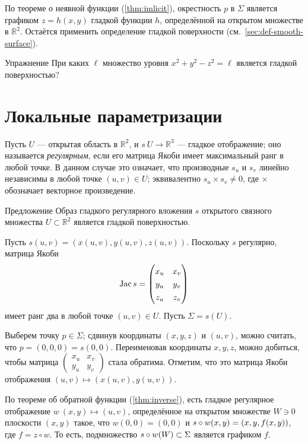 По теореме о неявной функции (\ref{thm:imlicit}), окрестность $p$ в $\Sigma$ является графиком $z=h(x,y)$ гладкой функции $h$, определённой на открытом множестве в $\mathbb{R}^2$.
Остаётся применить определение гладкой поверхности (см.~\ref{sec:def-smooth-surface}).
\qeds

\begin{thm}{Упражнение}\label{ex:hyperboloids}
При каких $\ell$ множество уровня $x^2+y^2-z^2=\ell$ является гладкой поверхностью?
\end{thm}

\section{Локальные параметризации}

Пусть $U$ --- открытая область в $\mathbb{R}^2$, и $s\:U\to \mathbb{R}^3$ --- гладкое отображение;
оно называется \emph{регулярным}, если его матрица Якоби имеет максимальный ранг в любой точке.
В данном случае это означает, что производные $s_u$ и $s_v$ линейно независимы в любой точке $(u,v)\in U$;
эквивалентно $s_u\times s_v\ne 0$, где $\times$ обозначает векторное произведение.

\begin{thm}{Предложение}\label{prop:graph-chart}
Образ гладкого регулярного вложения $s$ открытого связного множества $U\subset \mathbb{R}^2$ является гладкой поверхностью.
\end{thm}

Пусть $s(u,v)=(x(u,v),y(u,v),z(u,v))$.
Поскольку $s$ регулярно, матрица Якоби
\[\Jac s=
\renewcommand\arraystretch{1.3}
\begin{pmatrix}
x_u&x_v\\
y_u&y_v\\
z_u&z_v
\end{pmatrix}
\]
имеет ранг два в любой точке $(u,v)\in U$.
Пусть $\Sigma=s(U)$.

Выберем точку $p\in \Sigma$; сдвинув координаты $(x,y,z)$ и $(u,v)$, можно считать, что $p = (0,0,0) =s(0,0)$.
Переименовав координаты $x,y,z$, можно добиться, чтобы
матрица $\left(\begin{smallmatrix}
x_u&x_v\\
y_u&y_v
\end{smallmatrix}\right)$
стала обратима.
Отметим, что это матрица Якоби отображения $(u,v)\mapsto (x(u,v),y(u,v))$.

По теореме об обратной функции (\ref{thm:inverse}), есть гладкое регулярное отображение
$w\:(x,y)\mapsto (u,v)$, определённое на открытом множестве $W\ni 0$ плоскости $(x,y)$ такое, что $w(0,0)=(0,0)$ и $s\z\circ w(x,y)\z=(x,y,f(x,y))$, где $f=z\circ w$.
То есть, подмножество $s\z\circ w(W)\subset \Sigma$ является графиком $f$.

